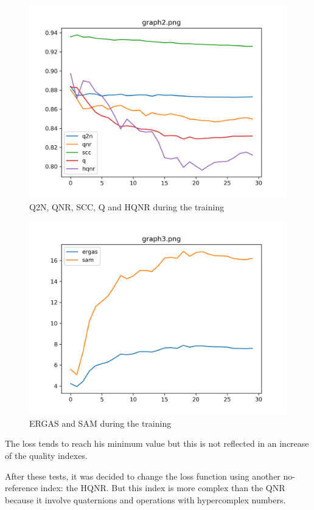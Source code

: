 \documentclass[12pt]{report}
\begin{document}
\begin{figure}
    \centering
    \includegraphics[scale=.5]{qnr2.png}
    \caption{Q2N, QNR, SCC, Q and HQNR during the training}
    \label{fig:qnr2}
\end{figure}


\begin{figure}
    \centering
    \includegraphics[scale=.5]{qnr3.png}
    \caption{ERGAS and SAM during the training}
    \label{fig:qnr3}
\end{figure}

The loss tends to reach his minimum value but this is not reflected in an increase of the quality indexes. 

After these tests, it was decided to change the loss function using another no-reference index: the HQNR.
But this index is more complex than the QNR because it involve quaternions and operations with hypercomplex numbers.
\end{document}

